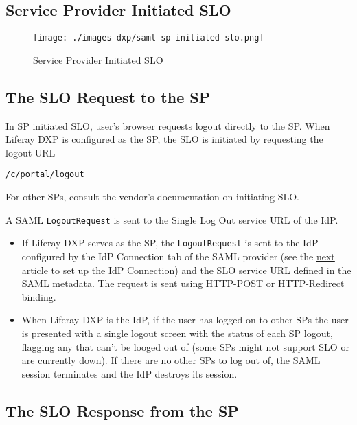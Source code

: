 \subsection{Service Provider Initiated
SLO}\label{service-provider-initiated-slo}

\begin{figure}
\centering
\texttt{[image: ./images-dxp/saml-sp-initiated-slo.png]}
\caption{Service Provider Initiated SLO}
\end{figure}

\subsection{The SLO Request to the SP}\label{the-slo-request-to-the-sp}

In SP initiated SLO, user's browser requests logout directly to the SP.
When Liferay DXP is configured as the SP, the SLO is initiated by
requesting the logout URL

\begin{verbatim}
/c/portal/logout
\end{verbatim}

For other SPs, consult the vendor's documentation on initiating SLO.

A SAML \texttt{LogoutRequest} is sent to the Single Log Out service URL
of the IdP.

\begin{itemize}
\item
  If Liferay DXP serves as the SP, the \texttt{LogoutRequest} is sent to
  the IdP configured by the IdP Connection tab of the SAML provider (see
  the \href{/docs/7-0/user/-/knowledge_base/u/setting-up-saml}{next
  article} to set up the IdP Connection) and the SLO service URL defined
  in the SAML metadata. The request is sent using HTTP-POST or
  HTTP-Redirect binding.
\item
  When Liferay DXP is the IdP, if the user has logged on to other SPs
  the user is presented with a single logout screen with the status of
  each SP logout, flagging any that can't be looged out of (some SPs
  might not support SLO or are currently down). If there are no other
  SPs to log out of, the SAML session terminates and the IdP destroys
  its session.
\end{itemize}

\subsection{The SLO Response from the
SP}\label{the-slo-response-from-the-sp-1}

